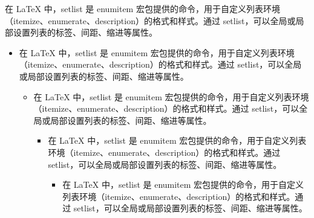 \documentclass{ctexart}
\begin{document}
在 LaTeX 中，setlist 是 enumitem 宏包提供的命令，用于自定义列表环境（itemize、enumerate、description）的格式和样式。通过 setlist，可以全局或局部设置列表的标签、间距、缩进等属性。
\begin{itemize} %
  \item 在 LaTeX 中，setlist 是 enumitem 宏包提供的命令，用于自定义列表环境（itemize、enumerate、description）的格式和样式。通过 setlist，可以全局或局部设置列表的标签、间距、缩进等属性。
  \begin{itemize}
    \item 在 LaTeX 中，setlist 是 enumitem 宏包提供的命令，用于自定义列表环境（itemize、enumerate、description）的格式和样式。通过 setlist，可以全局或局部设置列表的标签、间距、缩进等属性。
    \begin{itemize}
      \item 在 LaTeX 中，setlist 是 enumitem 宏包提供的命令，用于自定义列表环境（itemize、enumerate、description）的格式和样式。通过 setlist，可以全局或局部设置列表的标签、间距、缩进等属性。
      \begin{itemize}
        \item 在 LaTeX 中，setlist 是 enumitem 宏包提供的命令，用于自定义列表环境（itemize、enumerate、description）的格式和样式。通过 setlist，可以全局或局部设置列表的标签、间距、缩进等属性。
      \end{itemize}
    \end{itemize}
  \end{itemize}
\end{itemize}
\end{document}
